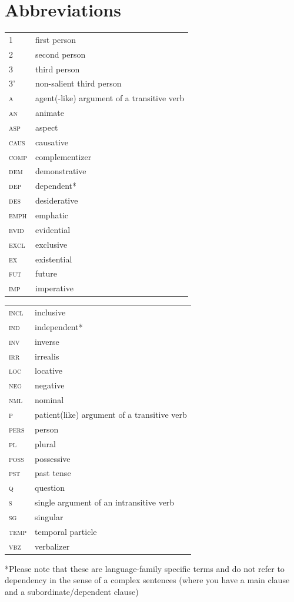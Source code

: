 \documentclass[output=paper,colorlinks,citecolor=brown,draft]{langscibook}
\begin{document}
\section*{Abbreviations}
\begin{tabularx}{.45\textwidth}{lQ}
1 & first person \\
2 & second person \\
3 & third person \\
3’ & non-salient third person\\
\scshape a & agent(-like) argument of a transitive verb \\
\scshape an & animate \\
\scshape asp & aspect \\
\scshape caus & causative \\
\scshape comp & complementizer \\
\scshape dem & demonstrative \\
\scshape dep & dependent* \\
\scshape des & desiderative \\
\scshape emph & emphatic \\
\scshape evid & evidential \\
\scshape excl & exclusive \\
\scshape ex & existential \\
\scshape fut & future \\
\scshape imp & imperative \\
\end{tabularx}
\begin{tabularx}{.45\textwidth}{lQ}
\scshape incl & inclusive \\
\scshape ind & independent* \\
\scshape inv & inverse \\
\scshape irr & irrealis \\
\scshape loc & locative \\
\scshape neg & negative \\
\scshape nml & nominal \\
\scshape p & patient(like) argument of a transitive verb \\
\scshape pers & person \\
\scshape pl & plural \\
\scshape poss & possessive \\
\scshape pst & past tense \\
\scshape q & question \\
\scshape s & single argument of an intransitive verb \\
\scshape sg & singular \\
\scshape temp & temporal particle \\
\scshape vbz & verbalizer \\
\end{tabularx}
\medskip
\noindent

*Please note that these are language-family specific terms and do not refer to dependency in the sense of a complex sentences (where you have a main clause and a subordinate/dependent clause)



\sloppy\printbibliography[heading=subbibliography,notkeyword=this]
\end{document}
